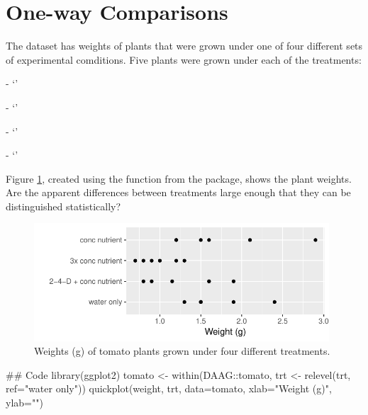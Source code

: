 \section{One-way Comparisons}

The dataset  has weights of plants that were grown
under one of four different sets of experimental comditions.
Five plants were grown under each of the treatments:
\begin{itemizz}
  \item[-] `'
  \item[-] `'
  \item[-] `'
  \item[-] `'
\end{itemizz}
Figure \ref{fig:Tomato}, created
using the function  from the  package,
shows the plant weights.  Are the apparent differences between
treatments large enough that they can be distinguished statistically?

\begin{figure}
\vspace*{-6pt}
\begin{Schunk}


\centerline{\includegraphics[width=0.98\textwidth]{figs/03-gg-tomato-1} }

\end{Schunk}
\caption{Weights (g) of tomato plants grown under four different
  treatments.\label{fig:Tomato}}
\end{figure}

\begin{Schunk}
\begin{Sinput}
## Code
library(ggplot2)
tomato <- within(DAAG::tomato, 
                 trt <- relevel(trt, ref="water only"))
quickplot(weight, trt, data=tomato,
          xlab="Weight (g)", ylab="")
\end{Sinput}
\end{Schunk}

